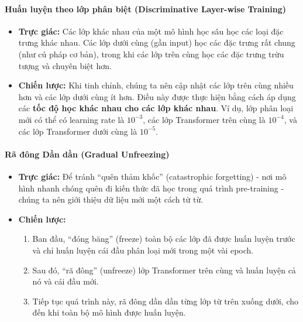 \paragraph{Huấn luyện theo lớp phân biệt (Discriminative Layer-wise Training)}
\begin{itemize}
    \item \textbf{Trực giác:} Các lớp khác nhau của một mô hình học sâu học các loại đặc trưng khác nhau. Các lớp dưới cùng (gần input) học các đặc trưng rất chung (như cú pháp cơ bản), trong khi các lớp trên cùng học các đặc trưng trừu tượng và chuyên biệt hơn.
    \item \textbf{Chiến lược:} Khi tinh chỉnh, chúng ta nên cập nhật các lớp trên cùng nhiều hơn và các lớp dưới cùng ít hơn. Điều này được thực hiện bằng cách áp dụng các \textbf{tốc độ học khác nhau cho các lớp khác nhau}. Ví dụ, lớp phân loại mới có thể có learning rate là $10^{-3}$, các lớp Transformer trên cùng là $10^{-4}$, và các lớp Transformer dưới cùng là $10^{-5}$.
\end{itemize}

\paragraph{Rã đông Dần dần (Gradual Unfreezing)}
\begin{itemize}
    \item \textbf{Trực giác:} Để tránh “quên thảm khốc” (catastrophic forgetting) - nơi mô hình nhanh chóng quên đi kiến thức đã học trong quá trình pre-training - chúng ta nên giới thiệu dữ liệu mới một cách từ từ.
    \item \textbf{Chiến lược:}
        \begin{enumerate}
            \item Ban đầu, “đóng băng” (freeze) toàn bộ các lớp đã được huấn luyện trước và chỉ huấn luyện cái đầu phân loại mới trong một vài epoch.
            \item Sau đó, “rã đông” (unfreeze) lớp Transformer trên cùng và huấn luyện cả nó và cái đầu mới.
            \item Tiếp tục quá trình này, rã đông dần dần từng lớp từ trên xuống dưới, cho đến khi toàn bộ mô hình được huấn luyện.
        \end{enumerate}
\end{itemize}

